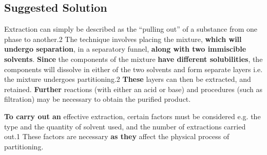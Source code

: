 \documentclass{article}
\begin{document}
\newpage
\subsection*{Suggested Solution}

Extraction can simply be described as the “pulling out” of a substance from one phase to another.2 The technique involves placing the mixture, \textbf{which will undergo separation}, in a separatory funnel, \textbf{along with two immiscible solvents}. \textbf{Since} the components of the mixture \textbf{have different solubilities}, the components will dissolve in either of the two solvents and form separate layers i.e. the mixture undergoes partitioning.2 \textbf{These} layers can then be extracted, and retained. \textbf{Further} reactions (with either an acid or base) and procedures (such as filtration) may be necessary to obtain the purified product.

\textbf{To carry out an} effective extraction, certain factors must be considered e.g. the type and the quantity of solvent used, and the number of extractions carried out.1 These factors are necessary \textbf{as they} affect the physical process of partitioning. 
\end{document}
